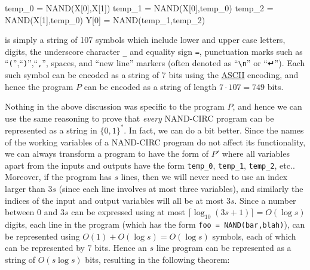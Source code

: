 \begin{code}
temp_0 = NAND(X[0],X[1])
temp_1 = NAND(X[0],temp_0)
temp_2 = NAND(X[1],temp_0)
Y[0] = NAND(temp_1,temp_2)
\end{code}

is simply a string of 107 symbols which include lower and upper case
letters, digits, the underscore character \texttt{\_} and equality sign
\texttt{=}, punctuation marks such as
``\texttt{(}'',``\texttt{)}'',``\texttt{,}'', spaces, and ``new line''
markers (often denoted as ``\texttt{\textbackslash n}'' or ``↵''). Each
such symbol can be encoded as a string of \(7\) bits using the
\href{https://en.wikipedia.org/wiki/ASCII}{ASCII} encoding, and hence
the program \(P\) can be encoded as a string of length
\(7 \cdot 107 = 749\) bits.

Nothing in the above discussion was specific to the program \(P\), and
hence we can use the same reasoning to prove that \emph{every} NAND-CIRC
program can be represented as a string in \(\{0,1\}^*\). In fact, we can
do a bit better. Since the names of the working variables of a NAND-CIRC
program do not affect its functionality, we can always transform a
program to have the form of \(P'\) where all variables apart from the
inputs and outputs have the form \texttt{temp\_0}, \texttt{temp\_1},
\texttt{temp\_2}, etc.. Moreover, if the program has \(s\) lines, then
we will never need to use an index larger than \(3s\) (since each line
involves at most three variables), and similarly the indices of the
input and output variables will all be at most \(3s\). Since a number
between \(0\) and \(3s\) can be expressed using at most
\(\lceil \log_{10}(3s+1) \rceil = O(\log s)\) digits, each line in the
program (which has the form \texttt{foo = NAND(bar,blah)}), can be
represented using \(O(1) + O(\log s) = O(\log s)\) symbols, each of
which can be represented by \(7\) bits. Hence an \(s\) line program can
be represented as a string of \(O(s \log s)\) bits, resulting in the
following theorem:

\hypertarget{asciirepprogramthm}{}


